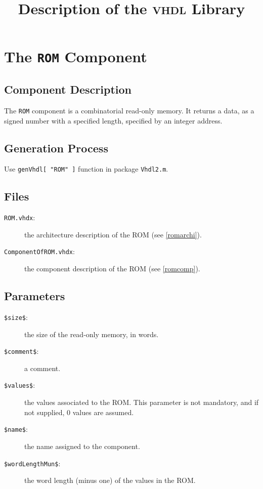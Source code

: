 \documentclass[11pt]{article}
\begin{document}
\newcommand{\vhdl}{\textsc{vhdl}}
\title{Description of the \vhdl{} Library}
\author{}
\date{}
\maketitle

\newcommand{\rom}{{\texttt{ROM}}}
\section{The \rom{} Component}

\subsection{Component Description}
The \rom{} component is a combinatorial read-only
memory. It returns a data, as a signed number with
a specified length, specified by an integer address.

\subsection{Generation Process}
Use \texttt{genVhdl[ "ROM" ]} function in package \texttt{Vhdl2.m}.

\subsection{Files}
\begin{description}
\item[\texttt{ROM.vhdx}:] the architecture description of the ROM (see \ref{romarchi}).
\item[\texttt{ComponentOfROM.vhdx}:] the component description of the ROM (see \ref{romcomp}).
\end{description}

\newcommand{\sizeparam}{\texttt{\$size\$}}
\newcommand{\commentparam}{\texttt{\$comment\$}}
\newcommand{\wlmunparam}{\texttt{\$wordLengthMun\$}}
\newcommand{\nameparam}{\texttt{\$name\$}}
\newcommand{\valuesparam}{\texttt{\$values\$}}

\subsection{Parameters}
\begin{description}
\item[\sizeparam{}: ] the size of the read-only memory, in words.
\item[\commentparam{}: ] a comment.
\item[\valuesparam{}: ] the values associated to the ROM. This parameter is not
mandatory, and if not supplied, 0 values are assumed.
\item[\nameparam{}: ] the name assigned to the component.
\item[\wlmunparam{}: ] the word length (minus one) of the values in the ROM. 
\end{description}
\end{document}
